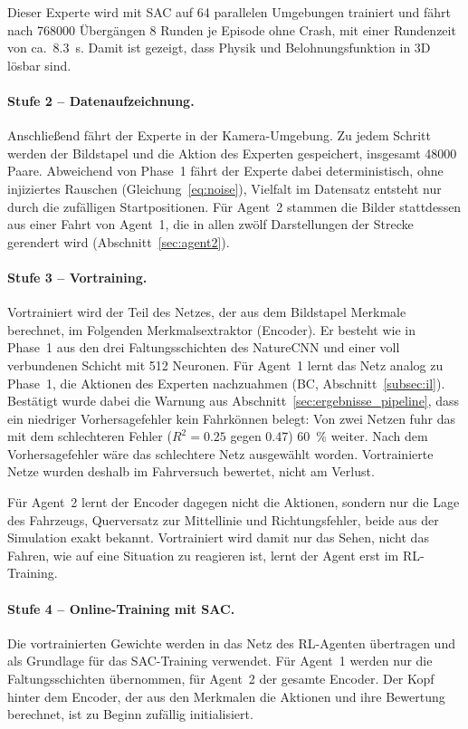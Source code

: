 Dieser Experte wird mit \ac{SAC} auf 64 parallelen Umgebungen trainiert und fährt nach \num{768000} Übergängen 8 Runden je Episode ohne Crash, mit einer Rundenzeit von ca.\ \SI{8.3}{\second}. Damit ist gezeigt, dass Physik und Belohnungsfunktion in 3D lösbar sind.

\paragraph{Stufe 2 -- Datenaufzeichnung.}
Anschließend fährt der Experte in der Kamera-Umgebung. Zu jedem Schritt werden der Bildstapel und die Aktion des Experten gespeichert, insgesamt \num{48000} Paare. Abweichend von Phase~1 fährt der Experte dabei deterministisch, ohne injiziertes Rauschen (Gleichung~\eqref{eq:noise}), Vielfalt im Datensatz entsteht nur durch die zufälligen Startpositionen. Für Agent~2 stammen die Bilder stattdessen aus einer Fahrt von Agent~1, die in allen zwölf Darstellungen der Strecke gerendert wird (Abschnitt~\ref{sec:agent2}).

\paragraph{Stufe 3 -- Vortraining.}
Vortrainiert wird der Teil des Netzes, der aus dem Bildstapel Merkmale berechnet, im Folgenden Merkmalsextraktor (Encoder). Er besteht wie in Phase~1 aus den drei Faltungsschichten des NatureCNN \cite{mnih2015human} und einer voll verbundenen Schicht mit 512 Neuronen. Für Agent~1 lernt das Netz analog zu Phase~1, die Aktionen des Experten nachzuahmen (\ac{BC}, Abschnitt~\ref{subsec:il}). Bestätigt wurde dabei die Warnung aus Abschnitt~\ref{sec:ergebnisse_pipeline}, dass ein niedriger Vorhersagefehler kein Fahrkönnen belegt: Von zwei Netzen fuhr das mit dem schlechteren Fehler ($R^2 = \num{0.25}$ gegen \num{0.47}) \SI{60}{\percent} weiter. Nach dem Vorhersagefehler wäre das schlechtere Netz ausgewählt worden. Vortrainierte Netze wurden deshalb im Fahrversuch bewertet, nicht am Verlust.

Für Agent~2 lernt der Encoder dagegen nicht die Aktionen, sondern nur die Lage des Fahrzeugs, Querversatz zur Mittellinie und Richtungsfehler, beide aus der Simulation exakt bekannt. Vortrainiert wird damit nur das Sehen, nicht das Fahren, wie auf eine Situation zu reagieren ist, lernt der Agent erst im \ac{RL}-Training.

\paragraph{Stufe 4 -- Online-Training mit SAC.}
Die vortrainierten Gewichte werden in das Netz des \ac{RL}-Agenten übertragen und als Grundlage für das \ac{SAC}-Training verwendet. Für Agent~1 werden nur die Faltungsschichten übernommen, für Agent~2 der gesamte Encoder. Der Kopf hinter dem Encoder, der aus den Merkmalen die Aktionen und ihre Bewertung berechnet, ist zu Beginn zufällig initialisiert.

